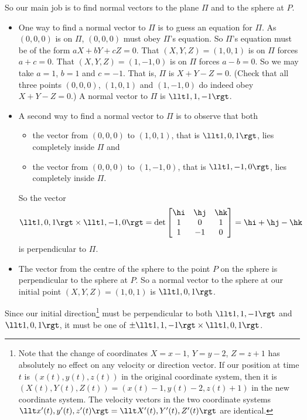 \begin{solution}
So our main job is to find normal vectors to the plane $\Pi$ and to the
sphere at $P$. 
\begin{itemize} 
\item One way to find a normal vector to $\Pi$ is to guess an equation for
$\Pi$. As $(0,0,0)$ is on $\Pi$, $(0,0,0)$ must obey $\Pi$'s equation.
So $\Pi$'s equation must be of the form $aX+bY+cZ=0$. That $(X,Y,Z)=(1,0,1)$ 
is on $\Pi$ forces $a+c=0$.   That $(X,Y,Z)=(1,-1,0)$ is on $\Pi$ forces 
$a-b=0$. So we may take $a=1$, $b=1$ and $c=-1$. That is, $\Pi$ is   
$X+Y-Z=0$.  (Check that all three points $(0,0,0)$, $(1,0,1)$ and
$(1,-1,0)$ do indeed obey $X+Y-Z=0$.) A normal vector to $\Pi$ is
$\llt 1,1,-1\rgt$.
\item A second way to find a normal vector to $\Pi$ is to observe that
both
\begin{itemize}
\item
the vector from $(0,0,0)$ to $(1,0,1)$, that is $\llt 1,0,1\rgt$, 
lies completely inside $\Pi$ and
\item
the vector from $(0,0,0)$ to $(1,-1,0)$, that is $\llt 1,-1,0\rgt$, 
lies completely inside $\Pi$.
\end{itemize}
So the vector
\begin{equation*}
\llt 1,0,1\rgt\times\llt 1,-1,0\rgt
=\det\left[\begin{matrix}
                     \hi & \hj & \hk \\
                     1   &  0  & 1 \\
                     1   &  -1  & 0
                \end{matrix}\right]
=\hi + \hj -\hk
\end{equation*}
is perpendicular to $\Pi$.
\item
The vector from the centre of the sphere to the point $P$ on the sphere
is perpendicular to the sphere at $P$. So a normal vector to 
the sphere at our initial point $(X,Y,Z)=(1,0,1)$ is $\llt 1,0,1\rgt$.
\end{itemize}
Since our initial direction\footnote{Note that the change of coordinates
$X=x-1$, $Y=y-2$, $Z=z+1$ has absolutely no effect on any velocity or direction
vector. If our position at time $t$ is $(x(t),y(t),z(t))$ in the
original coordinate system, then it is $(X(t),Y(t),Z(t))
=(x(t)-1,y(t)-2,z(t)+1)$ in the new coordinate system. The velocity
vectors in the two coordinate systems $\llt x'(t),y'(t),z'(t)\rgt
=\llt X'(t),Y'(t),Z'(t)\rgt$ are identical.}
must be perpendicular to both $\llt 1,1,-1\rgt$ and $\llt 1,0,1\rgt$, 
it must be one of  $\pm\llt 1,1,-1\rgt\times\llt 1,0,1\rgt$. 

\end{solution}
